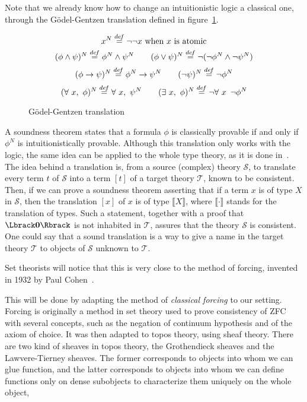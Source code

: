 Note that we already know how to change an intuitionistic logic a
classical one, through the Gödel-Gentzen translation defined in
figure~\ref{fig:GG-trans}.
\begin{figure}[ht]
  \centering

  \[x^N \overset{de\hspace{-0.2ex}f}{=} \lnot\lnot x\text{ when $x$ is atomic}\]
  \[(\phi \land \psi)^N \overset{de\hspace{-0.2ex}f}{=} \phi^N \land \psi^N \qquad
  (\phi\lor \psi)^N \overset{de\hspace{-0.2ex}f}{=} \lnot (\lnot\phi^N \land \lnot \psi^N)\]
  \[(\phi \to \psi)^N \overset{de\hspace{-0.2ex}f}{=} \phi^N \to \psi^N \qquad
    (\lnot \psi)^N \overset{de\hspace{-0.2ex}f}{=} \lnot \phi^N\]
  \[(\forall\ x,\ \phi)^N \defeq \forall\ x,\ \psi^N \qquad
  (\exists\ x,\ \phi)^N \defeq \lnot\forall\ x\,\ \lnot\phi^N\]
  \caption{Gödel-Gentzen translation}
  \label{fig:GG-trans}
\end{figure}
A soundness theorem states that a formula $\phi$ is classically
provable if and only if $\phi^N$ is intuitionistically
provable. Although this translation only works with the logic, the
same idea can be applied to the whole type theory, as it is done
in~\cite{jaber2012extending,forcing2016}. The idea behind a
translation is, from a source (complex) theory $\mathcal S$, to translate every
term $t$ of $\mathcal S$ into a term $[t]$ of a target theory
$\mathcal T$, known to be consistent. Then, if we can prove a
soundness theorem asserting that if a term $x$ is of type $X$ in
$\mathcal S$, then the translation $[x]$ of $x$ is of type $\Lbrack
X\Rbrack$, where $\Lbrack\cdot\Rbrack$ stands for the translation of
types. Such a statement, together with a proof that $\Lbrack \zero
\Rbrack$ is not inhabited in $\mathcal T$, assures that the theory
$\mathcal S$ is consistent. 
One could say that a sound translation is a way to give a name in the
target theory $\mathcal T$ to objects of $\mathcal S$ unknown to
$\mathcal T$.

Set theorists will notice that this is very close to the method of
forcing, invented in 1932 by Paul Cohen~\cite{cohen1966}.



This will be done by adapting the method of {\em classical forcing} to
our setting. Forcing is originally a method in set theory used to
prove consistency of ZFC with several concepts, such as the negation
of continuum 
hypothesis and of the axiom of choice.
It was then adapted to topos theory, using sheaf theory. There are two
kind of sheaves in topos theory, the Grothendieck sheaves and the
Lawvere-Tierney sheaves. The former corresponds to objects into whom
we can glue function, and the latter corresponds to objects into whom
we can define functions only on dense subobjects to characterize them
uniquely on the whole object, 



